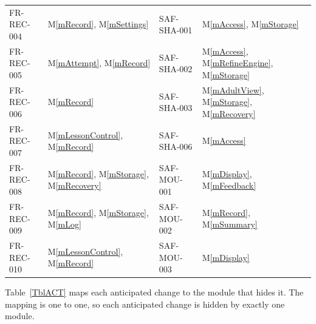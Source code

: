 \documentclass[12pt, titlepage]{article}
\newcommand{\mref}[1]{M\ref{#1}}
\begin{document}
{\begin{longtable}{@{}p{} p{} p{}
p{}@{}}
FR-REC-004 & \mref{mRecord}, \mref{mSettings} &
  SAF-SHA-001 & \mref{mAccess}, \mref{mStorage}\\
FR-REC-005 & \mref{mAttempt}, \mref{mRecord} &
  SAF-SHA-002 & \mref{mAccess}, \mref{mRefineEngine}, \mref{mStorage}\\
FR-REC-006 & \mref{mRecord} &
  SAF-SHA-003 & \mref{mAdultView}, \mref{mStorage}, \mref{mRecovery}\\
FR-REC-007 & \mref{mLessonControl}, \mref{mRecord} &
  SAF-SHA-006 & \mref{mAccess}\\
FR-REC-008 & \mref{mRecord}, \mref{mStorage}, \mref{mRecovery} &
  SAF-MOU-001 & \mref{mDisplay}, \mref{mFeedback}\\
FR-REC-009 & \mref{mRecord}, \mref{mStorage}, \mref{mLog} &
  SAF-MOU-002 & \mref{mRecord}, \mref{mSummary}\\
FR-REC-010 & \mref{mLessonControl}, \mref{mRecord} &
  SAF-MOU-003 & \mref{mDisplay}\\
\end{longtable}
}

Table~\ref{TblACT} maps each anticipated change to the module that hides it.
The mapping is one to one, so each anticipated change is hidden by exactly one
module.
\end{document}
